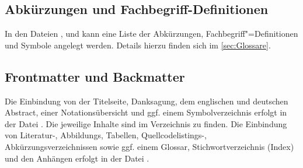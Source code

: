 \subsection[Abkürzungen und Fachbegriff-Definitionen]{Abkürzungen und Fachbegriff-Definitionen}%
%
%
%
%
\label{sec:Abkuerzungen}
%
In den Dateien
,
 und
kann eine Liste der Abkürzungen, Fachbegriff"=Definitionen und Symbole angelegt werden.
Details hierzu finden sich im \cref{sec:Glossare}.


\subsection[Frontmatter und Backmatter]{Frontmatter und Backmatter}%
%
%
%
%
%
%
%
%
%
%
%
\label{sec:FrontmatterBackmatter}
%
Die Einbindung von der Titelseite, Danksagung, dem englischen und deutschen Abstract,
einer Notationsübersicht und ggf. einem Symbolverzeichnis
erfolgt in der Datei .
Die jeweilige Inhalte sind im Verzeichnis  zu finden.
Die Einbindung von Literatur-, Abbildungs, Tabellen, Quellcodelistings-, Abkürzungsverzeichnissen sowie ggf. einem Glossar, Stichwortverzeichnis (Index) und den Anhängen erfolgt in der Datei .
